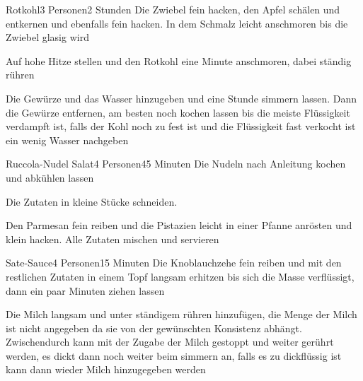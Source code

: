 
\begin{recipe}{Rotkohl}{3 Personen}{2 Stunden}
Die Zwiebel fein hacken, den Apfel schälen und entkernen und ebenfalls fein hacken. In dem Schmalz leicht anschmoren bis die Zwiebel glasig wird

Auf hohe Hitze stellen und den Rotkohl eine Minute anschmoren, dabei ständig rühren

Die Gewürze  und das Wasser hinzugeben und eine Stunde simmern lassen. Dann die Gewürze entfernen, am besten noch kochen lassen bis die meiste Flüssigkeit verdampft ist, falls der Kohl noch zu fest ist und die Flüssigkeit fast verkocht ist ein wenig Wasser nachgeben
\end{recipe}


\begin{recipe}{Ruccola-Nudel Salat}{4 Personen}{45 Minuten}
Die Nudeln nach Anleitung kochen und abkühlen lassen
 
Die Zutaten in kleine Stücke schneiden.

Den Parmesan fein reiben und die Pistazien leicht in einer Pfanne anrösten und klein hacken. Alle Zutaten mischen und servieren
\end{recipe}


\begin{recipe}{Sate-Sauce}{4 Personen}{15 Minuten}
Die Knoblauchzehe fein reiben und mit den restlichen Zutaten in einem Topf langsam erhitzen bis sich die Masse verflüssigt, dann ein paar Minuten ziehen lassen

Die Milch langsam und unter ständigem rühren hinzufügen, die Menge der Milch ist nicht angegeben da sie von der gewünschten Konsistenz abhängt. Zwischendurch kann mit der Zugabe der Milch gestoppt und weiter gerührt werden, es dickt dann noch weiter beim simmern an, falls es zu dickflüssig ist kann dann wieder Milch hinzugegeben werden
\end{recipe}

